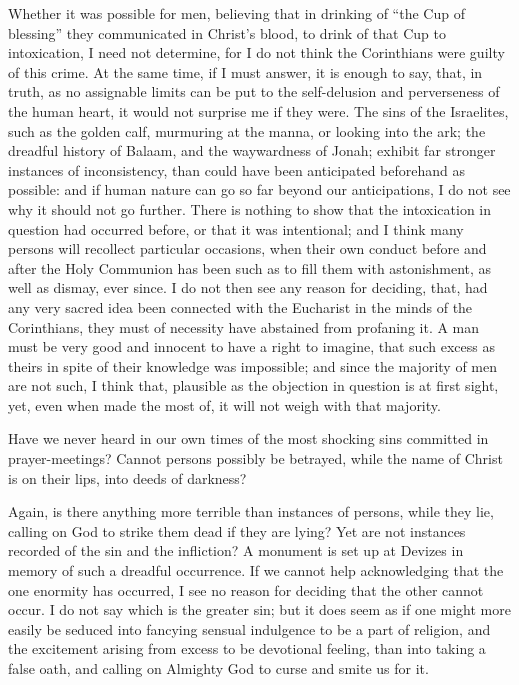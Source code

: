 Whether it was possible for men, believing that
in drinking of ``the Cup of blessing'' they communicated in Christ's
blood, to drink of that Cup to intoxication, I need not determine, for
I do not think the Corinthians were guilty of this crime. At the same
time, if I must answer, it is enough to say, that, in truth, as no
assignable limits can be put to the self-delusion and perverseness of
the human heart, it would not surprise me if they were. The sins of
the Israelites, such as the golden calf, murmuring at the manna, or
looking into the ark; the dreadful history of Balaam, and the
waywardness of Jonah; exhibit far stronger instances of inconsistency,
than could have been anticipated beforehand as possible: and if human
nature can go so far beyond our anticipations, I do not see why it
should not go further. There is nothing to show that the intoxication
in question had occurred before, or that it was intentional; and I
think many persons will recollect particular occasions, when their own
conduct before and after the Holy Communion has been such as to fill
them with astonishment, as well as dismay, ever since. I do not then
see any reason for deciding, that, had any very sacred idea been
connected with the Eucharist in the minds of the Corinthians, they
must of necessity have abstained from profaning it. A man must be very
good and innocent to have a right to imagine, that such excess as
theirs in spite of their knowledge was impossible; and since the
majority of men are not such, I think that, plausible as the objection
in question is at first sight, yet, even when made the most of, it
will not weigh with that majority.

Have we never heard in our own times of the most
shocking sins committed in prayer-meetings? Cannot persons
possibly be betrayed, while the name of Christ is on their lips, into
deeds of darkness?

Again, is there anything more terrible than
instances of persons, while they lie, calling on God to strike them
dead if they are lying? Yet are not instances recorded of the sin and
the infliction? A monument is set up at Devizes in memory of such a
dreadful occurrence. If we cannot help acknowledging that the one
enormity has occurred, I see no reason for deciding that the other
cannot occur. I do not say which is the greater sin; but it does seem
as if one might more easily be seduced into fancying sensual
indulgence to be a part of religion, and the excitement arising from
excess to be devotional feeling, than into taking a false oath, and
calling on Almighty God to curse and smite us for it.

